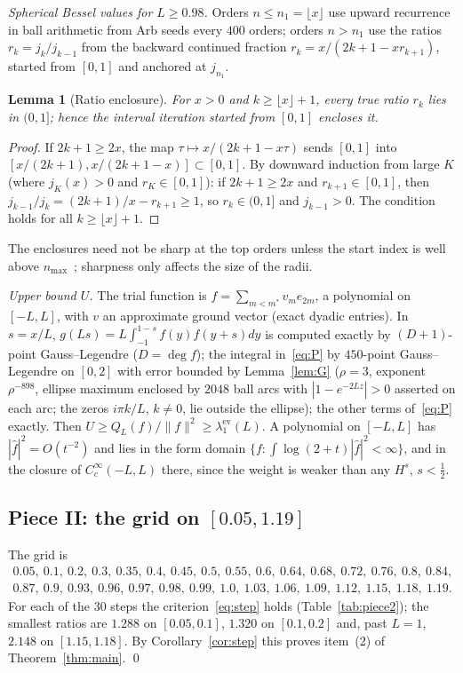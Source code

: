 \documentclass[11pt]{amsart}
\newcommand{\ev}{\mathrm{ev}}
\newtheorem{lemma}[theorem]{Lemma}
\theoremstyle{definition}
\theoremstyle{remark}
\numberwithin{equation}{section}
\begin{document}
\emph{Spherical Bessel values for $L\ge0.98$.} Orders $n\le n_1=\lfloor x\rfloor$ use upward recurrence in ball arithmetic from Arb seeds every $400$ orders; orders $n>n_1$ use the ratios $r_k=j_k/j_{k-1}$ from the backward continued fraction $r_k=x/(2k+1-xr_{k+1})$, started from $[0,1]$ and anchored at $j_{n_1}$.

\begin{lemma}[Ratio enclosure]
For $x>0$ and $k\ge\lfloor x\rfloor+1$, every true ratio $r_k$ lies in $(0,1]$; hence the interval iteration started from $[0,1]$ encloses it.
\end{lemma}
\begin{proof}
If $2k+1\ge2x$, the map $\tau\mapsto x/(2k+1-x\tau)$ sends $[0,1]$ into $[x/(2k+1),x/(2k+1-x)]\subset[0,1]$. By downward induction from large $K$ (where $j_K(x)>0$ and $r_K\in[0,1]$): if $2k+1\ge2x$ and $r_{k+1}\in[0,1]$, then $j_{k-1}/j_k=(2k+1)/x-r_{k+1}\ge1$, so $r_k\in(0,1]$ and $j_{k-1}>0$. The condition holds for all $k\ge\lfloor x\rfloor+1$.
\end{proof}
The enclosures need not be sharp at the top orders unless the start index is well above $n_{\max}$~\cite{Gautschi}; sharpness only affects the size of the radii.

\emph{Upper bound $U$.} The trial function is $f=\sum_{m<m^*}v_me_{2m}$, a polynomial on $[-L,L]$, with $v$ an approximate ground vector (exact dyadic entries). In $s=x/L$, $g(Ls)=L\int_{-1}^{1-s}f(y)f(y+s)dy$ is computed exactly by $(D+1)$-point Gauss--Legendre ($D=\deg f$); the integral in~\eqref{eq:P} by $450$-point Gauss--Legendre on $[0,2]$ with error bounded by Lemma~\ref{lem:G} ($\rho=3$, exponent $\rho^{-898}$, ellipse maximum enclosed by $2048$ ball arcs with $|1-e^{-2Lz}|>0$ asserted on each arc; the zeros $i\pi k/L$, $k\neq0$, lie outside the ellipse); the other terms of~\eqref{eq:P} exactly. Then $U\ge Q_L(f)/\|f\|^2\ge\lambda_1^\ev(L)$. A polynomial on $[-L,L]$ has $|\hat f|^2=O(t^{-2})$ and lies in the form domain $\{f:\int\log(2+t)|\hat f|^2<\infty\}$, and in the closure of $C_c^\infty(-L,L)$ there, since the weight is weaker than any $H^s$, $s<\tfrac12$.

\subsection{Piece II: the grid on $[0.05,1.19]$}\label{sec:piece2}
The grid is
\begin{gather*}
0.05,\ 0.1,\ 0.2,\ 0.3,\ 0.35,\ 0.4,\ 0.45,\ 0.5,\ 0.55,\ 0.6,\ 0.64,\ 0.68,\ 0.72,\ 0.76,\ 0.8,\ 0.84,\\
0.87,\ 0.9,\ 0.93,\ 0.96,\ 0.97,\ 0.98,\ 0.99,\ 1.0,\ 1.03,\ 1.06,\ 1.09,\ 1.12,\ 1.15,\ 1.18,\ 1.19.
\end{gather*}
For each of the $30$ steps the criterion~\eqref{eq:step} holds (Table~\ref{tab:piece2}); the smallest ratios are $1.288$ on $[0.05,0.1]$, $1.320$ on $[0.1,0.2]$ and, past $L=1$, $2.148$ on $[1.15,1.18]$. By Corollary~\ref{cor:step} this proves item~(2) of Theorem~\ref{thm:main}. \qed
\end{document}
